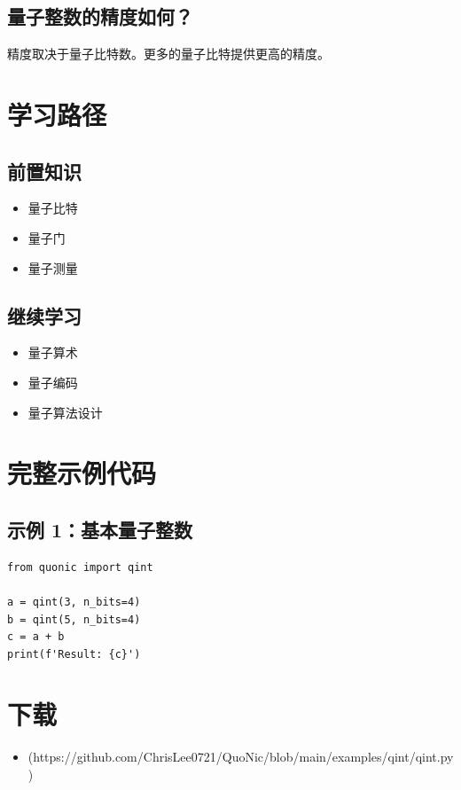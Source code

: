 \documentclass[12pt,a4paper]{article}
\begin{document}
\subsection{量子整数的精度如何？}

精度取决于量子比特数。更多的量子比特提供更高的精度。

\section{学习路径}

\subsection{前置知识}
\begin{itemize}
  \item 量子比特
  \item 量子门
  \item 量子测量
\end{itemize}

\subsection{继续学习}
\begin{itemize}
  \item 量子算术
  \item 量子编码
  \item 量子算法设计
\end{itemize}

\section{完整示例代码}

\subsection{示例 1：基本量子整数}

\begin{verbatim}
from quonic import qint

a = qint(3, n_bits=4)
b = qint(5, n_bits=4)
c = a + b
print(f'Result: {c}')
\end{verbatim}

\section{下载}

\begin{itemize}
  \item [qint.py](https://github.com/ChrisLee0721/QuoNic/blob/main/examples/qint/qint.py)
\end{itemize}
\end{document}

